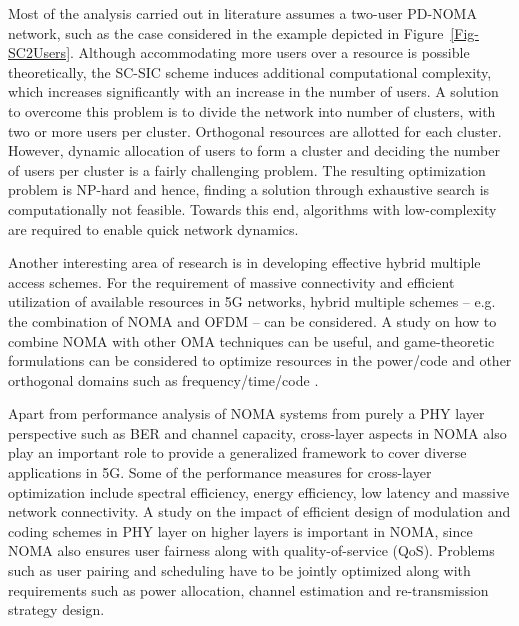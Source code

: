 \begin{multicols}{2}
Most of the analysis carried out in literature assumes a two-user PD-NOMA network, such as the case considered in the example depicted in Figure~\ref{Fig-SC2Users}. Although accommodating more users over a resource is possible theoretically, the SC-SIC scheme induces additional computational complexity, which increases significantly with an increase in the number of users. A solution to overcome this problem is to divide the network into number of clusters, with two or more users per cluster. Orthogonal resources are allotted for each cluster. However, dynamic allocation of users to form a cluster and deciding the  number of users per cluster is a fairly challenging problem. The resulting optimization problem is NP-hard and hence, finding a solution through exhaustive search is computationally not feasible. Towards this end, algorithms with low-complexity are required to enable quick network dynamics.

Another interesting area of research is in developing effective hybrid multiple access schemes. For the requirement of massive connectivity and efficient utilization of available resources in 5G networks, hybrid multiple schemes -- e.g. the combination of NOMA and OFDM -- can be considered. A study on how to combine NOMA with other OMA techniques can be useful, and game-theoretic formulations can be considered to optimize resources in the power/code and other orthogonal domains such as frequency/time/code \cite{Wang_TWC_2019}.

Apart from performance analysis of NOMA systems from purely a PHY layer perspective such as BER and channel capacity, cross-layer aspects in NOMA also play an important role to provide a generalized framework to cover diverse applications in 5G. Some of the performance measures for cross-layer optimization include spectral efficiency, energy efficiency, low latency and massive network connectivity. A study on the impact of efficient design of modulation and coding schemes in PHY layer on higher layers is important in NOMA, since NOMA also ensures user fairness along with quality-of-service (QoS). Problems such as user pairing and scheduling have to be jointly optimized along with requirements such as power allocation, channel estimation and re-transmission strategy design.


\end{multicols}
